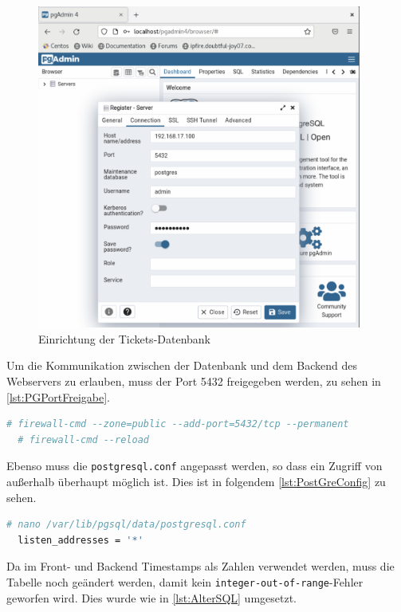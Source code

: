 \documentclass[a4paper,
    11pt,
    headings=small,
    ngerman,
    listof=totoc,
    numbers=noenddot]{scrreprt}[2021/11/13]
\begin{document}
\begin{figure}[htbp]
  \centering
  \includegraphics[width=0.95\textwidth]{data/PostGreSQL-Einrichtung.png}
  \caption{Einrichtung der Tickets-Datenbank}
  \label{fig:DBErstellung}
\end{figure}

Um die Kommunikation zwischen der Datenbank und dem Backend des Webservers zu erlauben, muss der Port 5432 freigegeben werden, zu sehen in \vref{lst:PGPortFreigabe}.

\begin{lstlisting}[language=bash,caption={Port-Freigabe einer CentOS-Firewall},label={lst:PGPortFreigabe}]
  # firewall-cmd --zone=public --add-port=5432/tcp --permanent
  # firewall-cmd --reload
\end{lstlisting}

Ebenso muss die \texttt{postgresql.conf} angepasst werden, so dass ein Zugriff von außerhalb überhaupt möglich ist. \autocite{vitux:PostgreSQL} Dies ist in folgendem \vref{lst:PostGreConfig} zu sehen.

\begin{lstlisting}[language=bash,caption={Einrichtung Zugriff PostGreSQL},label={lst:PostGreConfig}]
  # nano /var/lib/pgsql/data/postgresql.conf
  listen_addresses = '*'
\end{lstlisting}

Da im Front- und Backend Timestamps als Zahlen verwendet werden, muss die Tabelle noch geändert werden, damit kein \texttt{integer-out-of-range}-Fehler geworfen wird. Dies wurde wie in \vref{lst:AlterSQL} umgesetzt.
\end{document}
